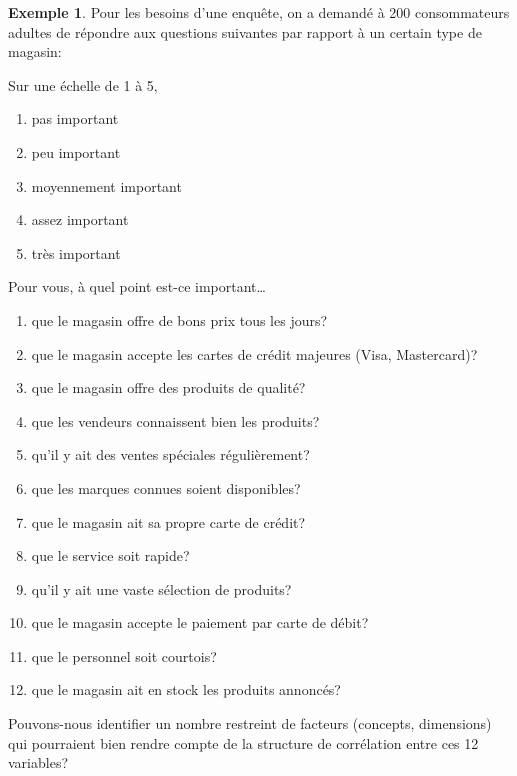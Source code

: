 \documentclass[
  11pt,
  letterpaper,
]{book}
\providecommand{\tightlist}{%
  \setlength{\itemsep}{0pt}\setlength{\parskip}{0pt}}
\theoremstyle{definition}
\theoremstyle{definition}
\newtheorem{example}{Exemple}[chapter]
\theoremstyle{definition}
\theoremstyle{remark}
\begin{document}
\begin{example}
\protect\hypertarget{exm:unnamed-chunk-1}{}{\label{exm:unnamed-chunk-1} }Pour les besoins d'une enquête, on a demandé à 200 consommateurs adultes de répondre aux questions suivantes par rapport à un certain type de magasin:

Sur une échelle de 1 à 5,

\begin{enumerate}
\def\labelenumi{\arabic{enumi}.}
\tightlist
\item
  pas important
\item
  peu important
\item
  moyennement important
\item
  assez important
\item
  très important
\end{enumerate}

Pour vous, à quel point est-ce important\ldots

\begin{enumerate}
\def\labelenumi{\arabic{enumi}.}
\tightlist
\item
  que le magasin offre de bons prix tous les jours?
\item
  que le magasin accepte les cartes de crédit majeures (Visa, Mastercard)?
\item
  que le magasin offre des produits de qualité?
\item
  que les vendeurs connaissent bien les produits?
\item
  qu'il y ait des ventes spéciales régulièrement?
\item
  que les marques connues soient disponibles?
\item
  que le magasin ait sa propre carte de crédit?
\item
  que le service soit rapide?
\item
  qu'il y ait une vaste sélection de produits?
\item
  que le magasin accepte le paiement par carte de débit?
\item
  que le personnel soit courtois?
\item
  que le magasin ait en stock les produits annoncés?
\end{enumerate}

Pouvons-nous identifier un nombre restreint de facteurs (concepts, dimensions) qui pourraient bien rendre compte de la structure de corrélation entre ces 12 variables?
\end{example}
\end{document}
